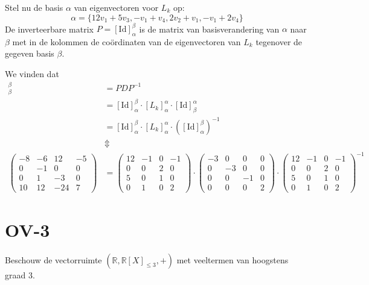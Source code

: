 \documentclass[kulak]{kulakarticle} %
\newcommand{\R}{\mathbb{R}} %
\begin{document}
\begin{itemize}
	Stel nu de basis \(\alpha\) van eigenvectoren voor \(L_k\) op: \[\alpha=\{12v_1+5v_3,-v_1+v_4,2v_2+v_1,-v_1+2v_4\}\]
	De inverteerbare matrix \(P=[\text{Id}]_{\alpha}^{\beta}\) is de matrix van basisverandering van \(\alpha\) naar \(\beta\) met in de kolommen de coördinaten van de eigenvectoren van \(L_k\) tegenover de gegeven basis \(\beta\).

	We vinden dat
	\begin{align*}
		[L_k]_{\beta}^{\beta} &=PDP^{-1}\\
								&=[\text{Id}]_{\alpha}^{\beta} \cdot [L_k]_{\alpha}^{\alpha} \cdot [\text{Id}]_{\beta}^{\alpha}\\
								&=[\text{Id}]_{\alpha}^{\beta} \cdot [L_k]_{\alpha}^{\alpha} \cdot ([\text{Id}]_{\alpha}^{\beta})^{-1}\\
								&\Updownarrow\\
		\left( \begin{matrix}
			-8 & -6 & 12 & -5 \\
			0 & -1 & 0 & 0 \\
			0 & 1 & -3 & 0 \\
			10 & 12 & -24 & 7
		\end{matrix} \right) &= \left( \begin{matrix}
		12 & -1 & 0 & -1 \\
		0 & 0 & 2 & 0 \\
		5 & 0 & 1 & 0 \\
		0 & 1 & 0 & 2
		\end{matrix} \right) \cdot \left( \begin{matrix}
		-3 & 0 & 0 & 0 \\
		0 & -3 & 0 & 0 \\
		0 & 0 & -1 & 0 \\
		0 & 0 & 0 & 2
		\end{matrix} \right) \cdot \left( \begin{matrix}
		12 & -1 & 0 & -1 \\
		0 & 0 & 2 & 0 \\
		5 & 0 & 1 & 0 \\
		0 & 1 & 0 & 2
		\end{matrix} \right)^{-1}
	\end{align*}
\end{itemize}

\section*{OV-3}

Beschouw de vectorruimte \((\R, \R[X]_{\leq 3}, +)\) met veeltermen van hoogstens graad 3.
\end{document}
